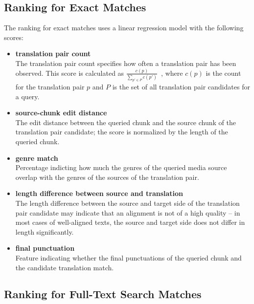 \subsection{Ranking for Exact Matches}

The ranking for exact matches uses a linear regression model with the following scores:

\begin{itemize}
	\item \textbf{translation pair count}\\
	The translation pair count specifies how often a translation pair has been observed. This score is calculated as $\frac{c(p)}{ \sum_{p' \in P}{c(p')}  } $\ , where $c(p)$ is the count for the translation pair $p$ and $P$ is the set of all translation pair candidates for a query.
	
	\item \textbf{source-chunk edit distance}\\
	The edit distance between the queried chunk and the source chunk of the translation pair candidate; the score is normalized by the length of the queried chunk.
	
	\item \textbf{genre match}\\
	Percentage indicting how much the genres of the queried media source overlap with the genres of the sources of the translation pair.

	\item \textbf{length difference between source and translation}\\
	The length difference between the source and target side of the translation pair candidate may indicate that an alignment is not of a high quality -- in most cases of well-aligned texts, the source and target side does not differ in length significantly.
	
	\item \textbf{final punctuation}\\
	Feature indicating whether the final punctuations of the queried chunk and the candidate translation match.
	
	
	
\end{itemize}



\subsection{Ranking for Full-Text Search Matches}



